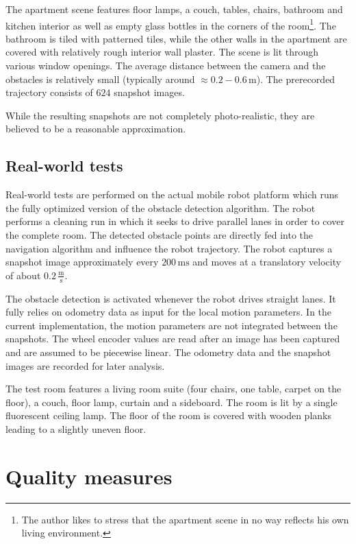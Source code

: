 The apartment scene features floor lamps, a couch, tables, chairs, bathroom and kitchen interior as well as empty glass bottles in the corners of the room\footnote{The author likes to stress that the apartment scene in no way reflects his own living environment.}. The bathroom is tiled with patterned tiles, while the other walls in the apartment are covered with relatively rough interior wall plaster. The scene is lit through various window openings. The average distance between the camera and the obstacles is relatively small (typically around $\approx 0.2-0.6\,\mathrm{m}$). The prerecorded trajectory consists of $624$ snapshot images.

While the resulting snapshots are not completely photo-realistic, they are believed to be a reasonable approximation.

\subsection{Real-world tests}

Real-world tests are performed on the actual mobile robot platform which runs the fully optimized version of the obstacle detection algorithm. The robot performs a cleaning run in which it seeks to drive parallel lanes in order to cover the complete room. The detected obstacle points are directly fed into the navigation algorithm and influence the robot trajectory. The robot captures a snapshot image approximately every $200 \, \mathrm{ms}$ and moves at a translatory velocity of about $0.2 \, \frac{\mathrm{m}}{\mathrm{s}}$.

The obstacle detection is activated whenever the robot drives straight lanes. It fully relies on odometry data as input for the local motion parameters. In the current implementation, the motion parameters are not integrated between the snapshots. The wheel encoder values are read after an image has been captured and are assumed to be piecewise linear. The odometry data and the snapshot images are recorded for later analysis.

The test room features a living room suite (four chairs, one table, carpet on the floor), a couch, floor lamp, curtain and a sideboard. The room is lit by a single fluorescent ceiling lamp. The floor of the room is covered with wooden planks leading to a slightly uneven floor.

\section{Quality measures}

